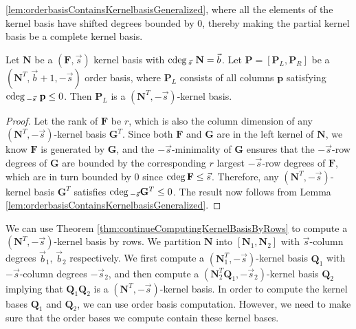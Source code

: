 \ref{lem:orderbasisContainsKernelbasisGeneralized}, where all the
elements of the kernel basis have shifted degrees bounded by $0$,
thereby making the partial kernel basis be a complete kernel basis. 
\begin{lem}
\label{lem:kernelBasisInOrderBasis} Let $\mathbf{N}$ be a $(\mathbf{F},\vec{s})$
kernel basis with ${\rm cdeg}\,_{\vec{s}}~\mathbf{N}=\vec{b}$. Let $\mathbf{P}=\left[\mathbf{P}_{L},\mathbf{P}_{R}\right]$
be a $\left(\mathbf{N}^{T},\vec{b}+1,-\vec{s}\right)$ order basis,
where $\mathbf{P}_{L}$ consists of all columns $\mathbf{p}$ satisfying
${\rm cdeg}\,_{-\vec{s}}~\mathbf{p}\le0$. Then $\mathbf{P}_{L}$ is a $(\mathbf{N}^{T},-\vec{s})$-kernel
basis. \end{lem}
\begin{proof}
Let the rank of $\mathbf{F}$ be $r$, which is also the column dimension
of any $(\mathbf{N}^{T},-\vec{s})$-kernel basis $\mathbf{G}^{T}$.
Since both $\mathbf{F}$ and $\mathbf{G}$ are in the left kernel
of $\mathbf{N}$, we know $\mathbf{F}$ is generated by $\mathbf{G}$,
and the $-\vec{s}$-minimality of $\mathbf{G}$ ensures that the $-\vec{s}$-row
degrees of $\mathbf{G}$ are bounded by the corresponding $r$ largest
$-\vec{s}$-row degrees of $\mathbf{F}$, which are in turn bounded
by $0$ since ${\rm cdeg}\,\mathbf{F}\le\vec{s}$. Therefore, any $(\mathbf{N}^{T},-\vec{s})$-kernel
basis $\mathbf{G}^{T}$ satisfies ${\rm cdeg}\,_{-\vec{s}}\mathbf{G}^{T}\le0$.
The result now follows from Lemma \ref{lem:orderbasisContainsKernelbasisGeneralized}. 
\end{proof}
We can use Theorem \ref{thm:continueComputingKernelBasisByRows} to
compute a $\left(\mathbf{N}^{T},-\vec{s}\right)$-kernel basis by
rows. We partition $\mathbf{N}$ into $\left[\mathbf{N}_{1},\mathbf{N}_{2}\right]$
with $\vec{s}$-column degrees $\vec{b}_{1}$, $\vec{b}_{2}$ respectively.
We first compute a $\left(\mathbf{N}_{1}^{T},-\vec{s}\right)$-kernel
basis $\mathbf{Q}_{1}$ with $-\vec{s}$-column degrees $-\vec{s}_{2}$,
and then compute a $\left(\mathbf{N}_{2}^{T}\mathbf{Q}_{1},-\vec{s}_{2}\right)$-kernel
basis $\mathbf{Q}_{2}$ implying that $\mathbf{Q}_{1}\mathbf{Q}_{2}$
is a $\left(\mathbf{N}^{T},-\vec{s}\right)$-kernel basis. In order
to compute the kernel bases $\mathbf{Q}_{1}$ and $\mathbf{Q}_{2}$,
we can use order basis computation. However, we need to make sure
that the order bases we compute contain these kernel bases.
